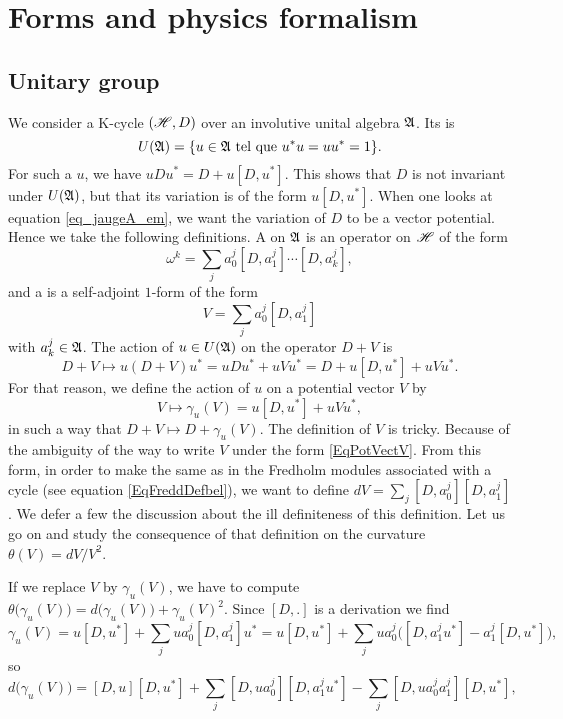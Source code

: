 %
   \section{Forms and physics formalism}
%

\subsection{Unitary group}

We consider a K-cycle $(\mathscr{H},D)$ over an involutive unital algebra $\mathfrak{A}$. Its  is
\[ 
  U(\mathfrak{A})=\{ u\in\mathfrak{A}\text{ tel que } u^*u=uu^*=1 \}.
\]
For such a $u$, we have $uDu^*=D+u[D,u^*]$. This shows that $D$ is not invariant under $U(\mathfrak{A})$, but that its variation is of the form $u[D,u^*]$. When one looks at equation \eqref{eq_jaugeA_em}, we want the variation of $D$ to be a vector potential. Hence we take the following definitions. A  on $\mathfrak{A}$ is an operator on $\mathscr{H}$ of the form
\[ 
  \omega^k=\sum_{j}a_0^j[D,a_1^j]\cdots[D,a_k^j],
\]
and a  is a self-adjoint $1$-form of the form
\begin{equation}   \label{EqPotVectV}
  V=\sum_{j}a_0^j[D,a_1^j]
\end{equation}
with $a_k^j\in\mathfrak{A}$. The action of $u\in U(\mathfrak{A})$ on the operator $D+V$ is
\[ 
  D+V\mapsto u(D+V)u^*=uDu^*+uVu^*=D+u[D,u^*]+uVu^*.
\]
For that reason, we define the action of $u$ on a potential vector $V$ by
\[ 
  V\mapsto\gamma_u(V)=u[D,u^*]+uVu^*,
\]
in such a way that $D+V\mapsto D+\gamma_u(V)$. The definition of $V$ is tricky. Because of the ambiguity of the way to write $V$ under the form \eqref{EqPotVectV}. From this form, in order to make the same as in the Fredholm modules associated with a cycle (see equation \eqref{EqFreddDefbel}), we want to define $dV=\sum_{j}[D,a^j_0][D,a^j_1]$. We defer a few the discussion about the ill definiteness of this definition. Let us go on and study the consequence of that definition on the curvature $\theta(V)=dV/V^2$.

If we replace $V$ by $\gamma_u(V)$, we have to compute $\theta\big( \gamma_u(V) \big)=d\big( \gamma_u(V) \big)+\gamma_u(V)^2$. Since $[D,.]$ is a derivation we find
\[ 
\gamma_u(V)=u[D,u^*]+\sum_{j}ua^j_0[D,a^j_1]u^*
		=u[D,u^*]+\sum_{j}ua^j_0\big( [D,a^j_1u^*]-a^j_1[D,u^*] \big),
\]
so
\[ 
  d\big( \gamma_u(V) \big)=[D,u][D,u^*]+\sum_{j}[D,ua^j_0][D,a^j_1u^*]-\sum_{j}[D,ua^j_0a^j_1][D,u^*],
\]

